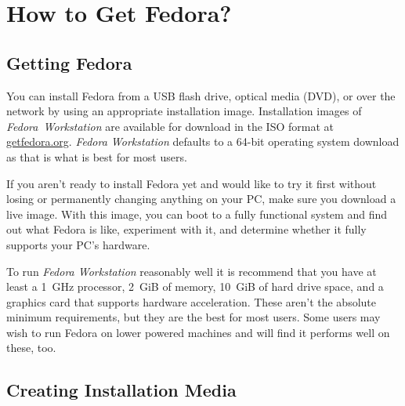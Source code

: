 \chapter*{How to Get Fedora?}
\section*{Getting Fedora}

You can install Fedora from a USB flash drive, optical media (DVD), or over the network by using an appropriate installation image. Installation images of \emph{Fedora~Workstation} are available for download in the ISO format at \url{getfedora.org}. \emph{Fedora Workstation} defaults to a 64-bit operating system download as that is what is best for most users.

If you aren't ready to install Fedora yet and would like to try it first without losing or permanently changing anything on your PC, make sure you download a live image. With this image, you can boot to a fully functional system and find out what Fedora is like, experiment with it, and determine whether it fully supports your PC's hardware.

To run \emph{Fedora Workstation} reasonably well it is recommend that you have at least a 1~GHz processor, 2~GiB of memory, 10~GiB of hard drive space, and a graphics card that supports hardware acceleration. These aren't the absolute minimum requirements, but they are the best for most users. Some users may wish to run Fedora on lower powered machines and will find it performs well on these, too.

\section*{Creating Installation Media}

